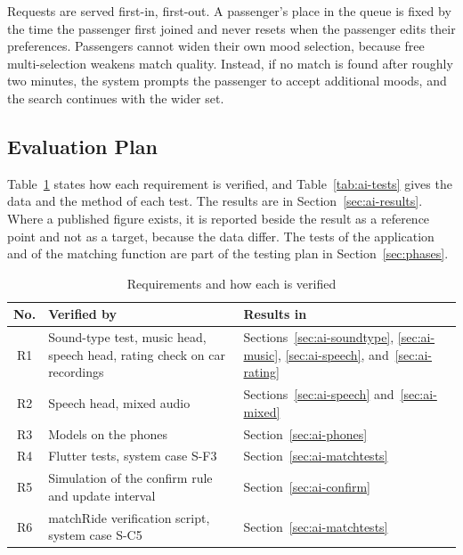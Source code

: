Requests are served first-in, first-out. A passenger's place in the queue is fixed by the time the passenger first joined and never resets when the passenger edits their preferences. Passengers cannot widen their own mood selection, because free multi-selection weakens match quality. Instead, if no match is found after roughly two minutes, the system prompts the passenger to accept additional moods, and the search continues with the wider set.

\subsection{Evaluation Plan}
\label{sec:ai-eval}
Table~\ref{tab:ai-verify} states how each requirement is verified, and Table~\ref{tab:ai-tests} gives the data and the method of each test. The results are in Section~\ref{sec:ai-results}. Where a published figure exists, it is reported beside the result as a reference point and not as a target, because the data differ. The tests of the application and of the matching function are part of the testing plan in Section~\ref{sec:phases}.

\begin{table}[htbp]
    \centering
    \caption{Requirements and how each is verified}\label{tab:ai-verify}
    \small
    \renewcommand{\arraystretch}{1.2}
    \begin{tabular}{|c|>{\raggedright\arraybackslash}p{}|>{\raggedright\arraybackslash}p{}|}
        \hline
        \textbf{No.} & \textbf{Verified by} & \textbf{Results in} \\
        \hline
        R1 & Sound-type test, music head, speech head, rating check on car recordings & Sections~\ref{sec:ai-soundtype}, \ref{sec:ai-music}, \ref{sec:ai-speech}, and~\ref{sec:ai-rating} \\
        \hline
        R2 & Speech head, mixed audio & Sections~\ref{sec:ai-speech} and~\ref{sec:ai-mixed} \\
        \hline
        R3 & Models on the phones & Section~\ref{sec:ai-phones} \\
        \hline
        R4 & Flutter tests, system case S-F3 & Section~\ref{sec:ai-matchtests} \\
        \hline
        R5 & Simulation of the confirm rule and update interval & Section~\ref{sec:ai-confirm} \\
        \hline
        R6 & matchRide verification script, system case S-C5 & Section~\ref{sec:ai-matchtests} \\
        \hline
    \end{tabular}
\end{table}

